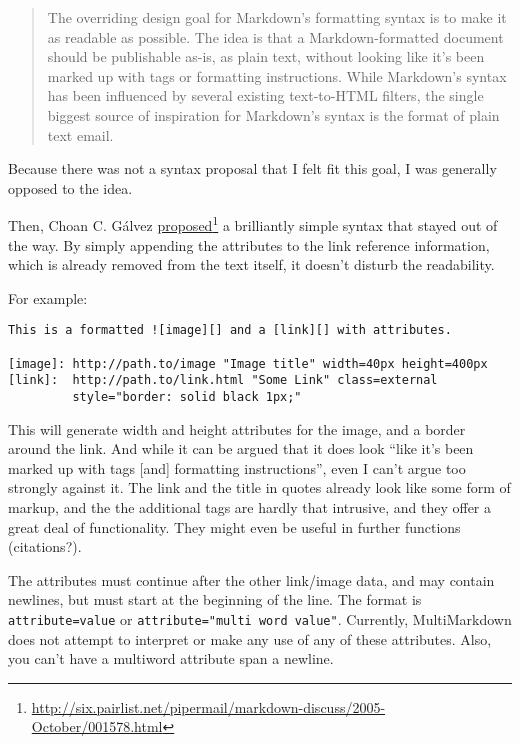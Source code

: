 \begin{quote}
The overriding design goal for Markdown's formatting syntax is to make
it as readable as possible. The idea is that a Markdown-formatted
document should be publishable as-is, as plain text, without looking
like it's been marked up with tags or formatting instructions. While
Markdown's syntax has been influenced by several existing text-to-HTML
filters, the single biggest source of inspiration for Markdown's
syntax is the format of plain text email.
\end{quote}

Because there was not a syntax proposal that I felt fit this goal, I was generally opposed to the idea.

Then, Choan C. Gálvez \href{http://six.pairlist.net/pipermail/markdown-discuss/2005-October/001578.html}{proposed}\footnote{\href{http://six.pairlist.net/pipermail/markdown-discuss/2005-October/001578.html}{http:\slash{}\slash{}six.pairlist.net\slash{}pipermail\slash{}markdown-discuss\slash{}2005-October\slash{}001578.html}} a brilliantly simple syntax that
stayed out of the way. By simply appending the attributes to the link
reference information, which is already removed from the text itself, it
doesn't disturb the readability.

For example:

\begin{verbatim}
This is a formatted ![image][] and a [link][] with attributes.

[image]: http://path.to/image "Image title" width=40px height=400px
[link]:  http://path.to/link.html "Some Link" class=external
         style="border: solid black 1px;"
\end{verbatim}

This will generate width and height attributes for the image, and a border
around the link. And while it can be argued that it does look ``like it's been
marked up with tags {[and]} formatting instructions'', even I can't argue too
strongly against it. The link and the title in quotes already look like some
form of markup, and the the additional tags are hardly that intrusive, and
they offer a great deal of functionality. They might even be useful in further
functions (citations?).

The attributes must continue after the other link\slash{}image data, and may contain
newlines, but must start at the beginning of the line. The format is
\texttt{attribute=value} or \texttt{attribute="multi word value"}. Currently, MultiMarkdown
does not attempt to interpret or make any use of any of these attributes.
Also, you can't have a multiword attribute span a newline.

